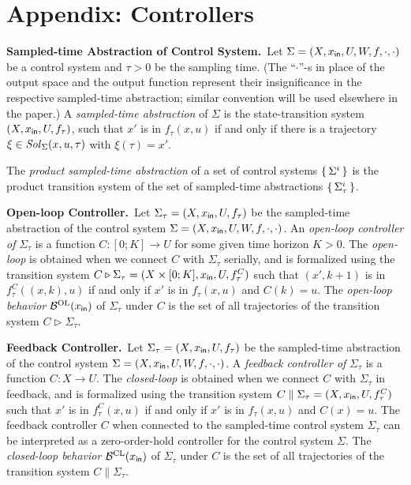 \section{Appendix: Controllers}
\label{sec:controllers}
\smallskip
\noindent\textbf{Sampled-time Abstraction of Control System.}\
Let $\Sigma = (X, x_{\mathsf{in}}, U, W, f, \cdot, \cdot)$ be a control system and $\tau>0$ be the sampling time.
(The ``$\cdot$''-s in place of the output space and the output function represent their insignificance in the respective sampled-time abstraction; similar convention will be used elsewhere in the paper.)
A \emph{sampled-time abstraction} of $\Sigma$ is the state-transition system $(X,x_{\mathsf{in}},U,f_\tau)$, such that $x'$ is in $f_\tau(x,u)$ if and only if there is a trajectory $\xi\in \mathit{Sol}_\Sigma(x,u,\tau)$ with $\xi(\tau)=x'$.

The \emph{product sampled-time abstraction} of a set of control systems $\set{\Sigma^i} $ is the product transition system of the set of sampled-time abstractions $\set{\Sigma^i_\tau} $.

\smallskip
\noindent\textbf{Open-loop Controller.}\
Let $\Sigma_\tau=(X,x_{\mathsf{in}},U,f_\tau)$ be the sampled-time abstraction of the control system $\Sigma=(X,x_{\mathsf{in}},U,W,f,\cdot,\cdot)$.
An \emph{open-loop controller of} $\Sigma_\tau$ is a function $C\colon [0;K]\to U$ for some given time horizon $K>0$.
The \emph{open-loop} is obtained when we connect $C$ with $\Sigma_\tau$ serially, and is formalized using the transition system $C \triangleright \Sigma_\tau = (X\times [0;K],x_{\mathsf{in}},U,f_\tau^C)$ such that $(x',k+1)$ is in $f_\tau^C((x,k),u)$ if and only if $x'$ is in $f_\tau(x,u)$ and $C(k)=u$.
The \emph{open-loop behavior} $\mathcal{B}^{\mathrm{OL}}(x_{\mathsf{in}})$ of $\Sigma_\tau$ under $C$ is the set of all trajectories of the transition system $C \triangleright \Sigma_\tau$.

\smallskip
\noindent\textbf{Feedback Controller.}\
Let $\Sigma_\tau=(X,x_{\mathsf{in}},U,f_\tau)$ be the sampled-time abstraction of the control system $\Sigma=(X,x_{\mathsf{in}},U,W,f,\cdot,\cdot)$.
A \emph{feedback controller of} $\Sigma_\tau$ is a function $C\colon X\to U$.
The \emph{closed-loop} is obtained when we connect $C$ with $\Sigma_\tau$ in feedback, and is formalized using the transition system $C\parallel\Sigma_\tau = (X,x_{\mathsf{in}},U,f_\tau^C)$ such that $x'$ is in $f_\tau^C(x,u)$ if and only if $x'$ is in $f_\tau(x,u)$ and $C(x)=u$.
The feedback controller $C$ when connected to the sampled-time control system $\Sigma_\tau$ can be interpreted as a zero-order-hold controller for the control system $\Sigma$.
The \emph{closed-loop behavior} $\mathcal{B}^{\mathrm{CL}}(x_{\mathsf{in}})$ of $\Sigma_\tau$ under $C$ is the set of all trajectories of the transition system $C\parallel\Sigma_\tau$.


